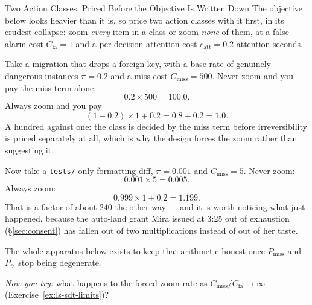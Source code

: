 \documentclass[11pt,a4paper]{article}
\theoremstyle{definition}
\theoremstyle{plain}
\begin{document}
\begin{pdexample}{Two Action Classes, Priced Before the Objective Is Written Down}
\setlength{\parskip}{4pt plus 1pt}
The objective below looks heavier than it is, so price two action classes with it first, in its crudest collapse: zoom \emph{every} item in a class or zoom \emph{none} of them, at a false-alarm cost $C_{\text{fa}}=1$ and a per-decision attention cost $c_{\mathrm{att}}=0.2$ attention-seconds.

Take a migration that drops a foreign key, with a base rate of genuinely dangerous instances $\pi=0.2$ and a miss cost $C_{\text{miss}}=500$. Never zoom and you pay the miss term alone,
\[
0.2\times 500 = 100.0.
\]
Always zoom and you pay
\[
(1-0.2)\times 1 + 0.2 = 0.8+0.2 = 1.0.
\]
A hundred against one: the class is decided by the miss term before irreversibility is priced separately at all, which is why the design forces the zoom rather than suggesting it.

Now take a \texttt{tests/}-only formatting diff, $\pi=0.001$ and $C_{\text{miss}}=5$. Never zoom:
\[
0.001\times 5 = 0.005.
\]
Always zoom:
\[
0.999\times 1 + 0.2 = 1.199.
\]
That is a factor of about $240$ the other way --- and it is worth noticing what just happened, because the auto-land grant Mira issued at 3:25 out of exhaustion (\S\ref{sec:consent}) has fallen out of two multiplications instead of out of her taste.

The whole apparatus below exists to keep that arithmetic honest once $P_{\text{miss}}$ and $P_{\text{fa}}$ stop being degenerate.

\emph{Now you try:} what happens to the forced-zoom rate as $C_{\text{miss}}/C_{\text{fa}}\to\infty$ (Exercise~\ref{ex:ls-sdt-limits})?
\end{pdexample}
\end{document}
